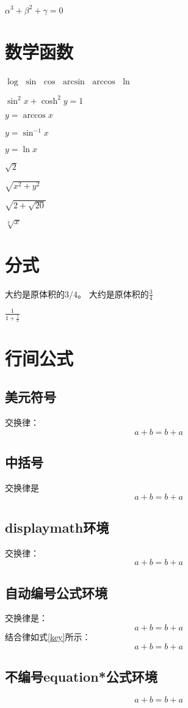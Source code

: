 \documentclass{article}
\begin{document}
	$\alpha^3+\beta^2+\gamma=0$
	
	\section{数学函数}
	$\log$
	$\sin$
	$\cos$
	$\arcsin$
	$\arccos$
	$\ln$
	
	$\sin^2 x+\cosh^2 y=1$
	
	$y=\arccos x$
	
	$y=\sin^{-1} x$
	
	$y=\ln x$
	
	$\sqrt{2}$
	
	$\sqrt{x^2+y^2}$
	
	$\sqrt{2+\sqrt{20}}$
	
	$\sqrt[4]{x}$
	
	\section{分式}
	大约是原体积的$3/4$。
	大约是原体积的$\frac{3}{4}$
	
	$\frac{1}{1+\frac{1}{x}}$
	
	\section{行间公式}
	\subsection{美元符号}
	交换律：$$a+b=b+a$$

	\subsection{中括号}
	交换律是\[a+b=b+a\]
	
	\subsection{displaymath环境}
	交换律：
	\begin{displaymath}
	a+b=b+a
	\end{displaymath}
	
	\subsection{自动编号公式环境}
	交换律是：
	\begin{equation}
		a+b=b+a
	\end{equation}
	结合律如式\ref{key}所示：
	\begin{equation}
	a+b=b+a\label{key}
	\end{equation}
	
	\subsection{不编号equation*公式环境}
	\begin{equation*}
		a+b=b+a
	\end{equation*}
\end{document}

